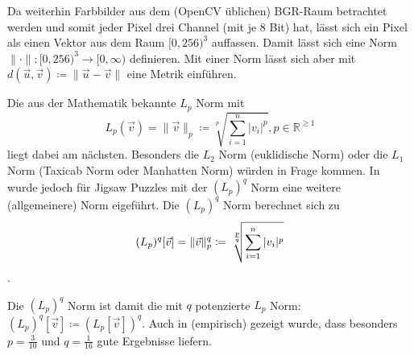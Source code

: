 \documentclass{whswinvcbook}
\begin{document}
Da weiterhin Farbbilder aus dem (OpenCV üblichen) BGR-Raum betrachtet werden und somit jeder Pixel drei Channel (mit je 8 Bit) hat, lässt sich ein Pixel als einen Vektor aus dem Raum $[0,256)^3$ auffassen. Damit lässt sich eine Norm $\|\cdot\|:[0,256)^3\rightarrow[0,\infty)$ definieren. Mit einer Norm lässt sich aber mit $d(\vec{u},\vec{v})\coloneqq\|\vec{u}-\vec{v}\|$ eine Metrik einführen.

Die aus der Mathematik bekannte $L_p$ Norm mit $$L_p(\vec{v})=\|\vec{v}\|_p\coloneqq\sqrt[p]{\sum_{i=1}^{n}|v_i|^p},p\in\mathbb{R}^{\geq1}$$ liegt dabei am nächsten. Besonders die $L_2$ Norm (euklidische Norm) oder die $L_1$ Norm (Taxicab Norm oder Manhatten Norm) würden in Frage kommen. In \cite{pomeranz} wurde jedoch für Jigsaw Puzzles mit der $(L_p)^q$ Norm eine weitere (allgemeinere) Norm eigeführt. Die $(L_p)^q$ Norm berechnet sich zu $$(L_p)^q[\vec{v}]=\|\vec{v}\|_p^q\coloneqq \sqrt[\leftroot{-2}\uproot{5}\frac{p}{q}]{\sum_{i=1}^{n}|v_i|^p}$$.

Die $(L_p)^q$ Norm ist damit die mit $q$ potenzierte $L_p$ Norm: $(L_p)^q[\vec{v}]\coloneqq(L_p[\vec{v}])^q$. Auch in \cite{pomeranz} (empirisch) gezeigt wurde, dass besonders $p=\frac{3}{10}$ und $q=\frac{1}{16}$ gute Ergebnisse liefern.
\end{document}
